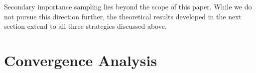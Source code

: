 \documentclass[11pt,a4paper]{article}
\theoremstyle{definition}
\begin{document}
\noindent Secondary importance sampling lies beyond the scope of this paper. While we do not pursue this direction further, the theoretical results developed in the next section extend to all three strategies discussed above.






\section{Convergence Analysis}
\label{sec:conv:analysis}
\end{document}
